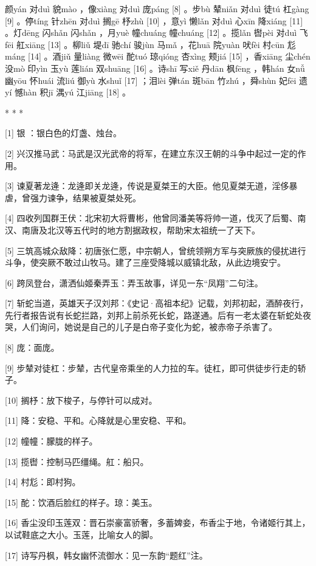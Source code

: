 \documentclass[12pt,UTF8]{ctexbook}
\begin{document}
颜yán 对duì 貌mào ，像xiàng 对duì 庞páng [8] 。步bù 辇niǎn 对duì 徒tú 杠gàng [9] 。停tíng 针zhēn 对duì 搁gē 杼zhù [10] ，意yì 懒lǎn 对duì 心xīn 降xiáng [11] 。灯dēng 闪shǎn 闪shǎn ，月yuè 幢chuáng 幢chuáng [12] 。揽lǎn 辔pèi 对duì 飞fēi 舡xiāng [13] 。柳liǔ 堤dī 驰chí 骏jùn 马mǎ ，花huā 院yuàn 吠fèi 村cūn 尨máng [14] 。酒jiǔ 量liàng 微wēi 酡tuó 琼qióng 杏xìng 颊jiá [15] ，香xiāng 尘chén 没mò 印yìn 玉yù 莲lián 双shuāng [16] 。诗shī 写xiě 丹dān 枫fēng ，韩hán 女nǚ 幽yōu 怀huái 流liú 御yù 水shuǐ [17] ；泪lèi 弹tán 斑bān 竹zhú ，舜shùn 妃fēi 遗yí 憾hàn 积jī 湡yú 江jiāng [18] 。



* * *



[1] 银 ：银白色的灯盏、烛台。

[2] 兴汉推马武：马武是汉光武帝的将军，在建立东汉王朝的斗争中起过一定的作用。

[3] 谏夏著龙逄：龙逄即关龙逄，传说是夏桀王的大臣。他见夏桀无道，淫侈暴虐，曾强力谏争，结果被夏桀处死。

[4] 四收列国群王伏：北宋初大将曹彬，他曾同潘美等将帅一道，伐灭了后蜀、南汉、南唐及北汉等五代时的地方割据政权，帮助宋太祖统一了天下。

[5] 三筑高城众敌降：初唐张仁愿，中宗朝人，曾统领朔方军与突厥族的侵扰进行斗争，使突厥不敢过山牧马。建了三座受降城以威镇北敌，从此边境安宁。

[6] 跨凤登台，潇洒仙姬秦弄玉：弄玉故事，详见一东“凤翔”二句注。

[7] 斩蛇当道，英雄天子汉刘邦：《史记·高祖本纪》记载，刘邦初起，酒醉夜行，先行者报告说有长蛇拦路，刘邦上前杀死长蛇，路遂通。后有一老太婆在斩蛇处夜哭，人们询问，她说是自己的儿子是白帝子变化为蛇，被赤帝子杀害了。

[8] 庞：面庞。

[9] 步辇对徒杠：步辇，古代皇帝乘坐的人力拉的车。徒杠，即可供徒步行走的轿子。

[10] 搁杼：放下梭子，与停针可以成对。

[11] 降：安稳、平和。心降就是心里安稳、平和。

[12] 幢幢：朦胧的样子。

[13] 揽辔：控制马匹缰绳。舡：船只。

[14] 村尨：即村狗。

[15] 酡：饮酒后脸红的样子。琼：美玉。

[16] 香尘没印玉莲双：晋石崇豪富骄奢，多蓄婢妾，布香尘于地，令诸姬行其上，以试鞋底之大小。玉莲，比喻女人的脚。

[17] 诗写丹枫，韩女幽怀流御水：见一东韵“题红”注。
\end{document}
